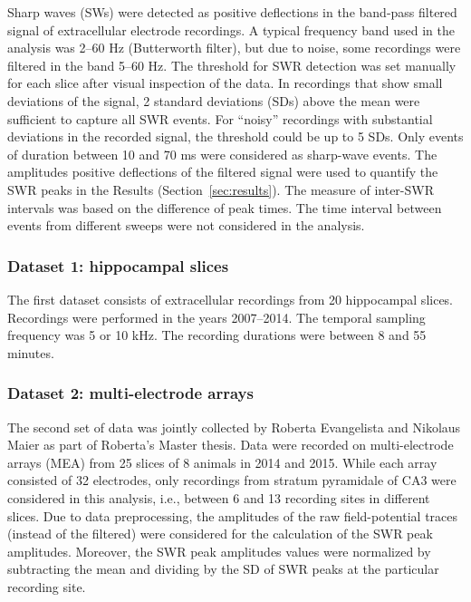     Sharp waves (SWs) were detected as positive deflections in the band-pass
    filtered signal of extracellular electrode recordings. A typical frequency
    band used in the analysis was 2--60 Hz (Butterworth filter), but due to
    noise, some recordings were filtered in the band 5--60 Hz. The threshold
    for SWR detection was set manually for each slice after visual inspection of
    the data. In recordings that show small deviations of the signal, 2
    standard deviations (SDs) above the mean were sufficient to capture all SWR
    events. For ``noisy'' recordings with substantial deviations in the recorded
    signal, the threshold could be up to 5 SDs. Only events of duration between
    10 and 70 ms were considered as sharp-wave events. The amplitudes positive
    deflections of the filtered signal were used to quantify the SWR peaks in
    the Results (Section~\ref{sec:results}). The measure of inter-SWR intervals
    was based on the difference of peak times. The time interval between events
    from different sweeps were not considered in the analysis.
 
    \subsubsection{Dataset 1: hippocampal slices}
      The first dataset consists of extracellular recordings from 20 hippocampal
      slices. Recordings were performed in the years 2007--2014. The temporal
      sampling frequency was 5 or 10 kHz. The recording durations were between 8
      and 55 minutes.

    \subsubsection{Dataset 2: multi-electrode arrays}
      The second set of data was jointly collected by Roberta Evangelista and Nikolaus
      Maier as part of Roberta's Master thesis. Data were recorded on
      multi-electrode arrays (MEA) from 25 slices of 8 animals in 2014 and
      2015. While each array consisted of 32 electrodes, only recordings from
      stratum pyramidale of CA3 were considered in this analysis, i.e., between
      6 and 13 recording sites in different slices. Due to data preprocessing,
      the amplitudes of the raw field-potential traces (instead of the
      filtered) were considered for the calculation of the SWR peak amplitudes.
      Moreover, the SWR peak amplitudes values were normalized by subtracting the
      mean and dividing by the SD of SWR peaks at the particular recording site.


